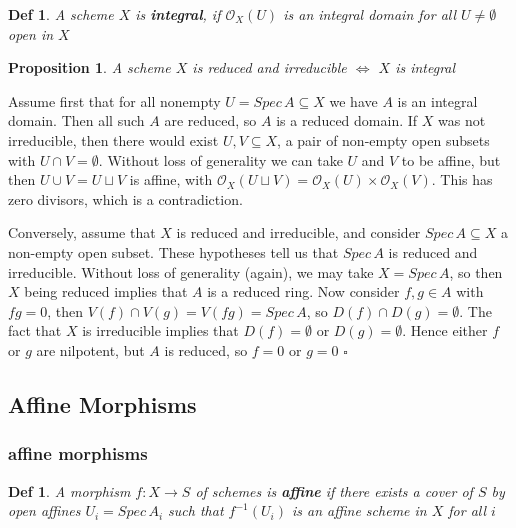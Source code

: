 \documentclass{article}
\newtheorem{definition}[theorem]{Def}
\newtheorem{proposition}[theorem]{Proposition}
\newenvironment{Proof}{{\noindent \indent \it Proof:\quad}}{\hfill $\square$\par}
\begin{document}
\begin{definition}
    A scheme $X$ is \textbf{integral}, if $\mathcal O_X(U)$ is an integral domain for all $U \ne \emptyset$ open in $X$
\end{definition}

\begin{proposition}
    A scheme $X$ is reduced and irreducible $\Leftrightarrow$ $X$ is integral
\end{proposition}
\begin{Proof}
    Assume first that for all nonempty $U = Spec\, A \subseteq X$ we have $A$ is an integral domain. Then all such $A$ are reduced, so $A$ is a reduced domain. If $X$ was not irreducible, then there would exist $U, V \subseteq X$, a pair of non-empty open subsets with $U \cap V = \emptyset$. Without loss of generality we can take $U$ and $V$ to be affine, but then $U \cup V = U \sqcup V$ is affine, with $\mathcal O_X(U \sqcup V) = \mathcal O_X(U)\times \mathcal O_X(V)$. This has zero divisors, which is a contradiction.
    
Conversely, assume that $X$ is reduced and irreducible, and consider
$Spec\, A \subseteq X$ a non-empty open subset. These hypotheses tell us that $Spec\, A$ is reduced and irreducible.
Without loss of generality (again), we may take $X = Spec\, A$, so then $X$ being reduced implies that
$A$ is a reduced ring. Now consider $f, g \in A$ with $fg = 0$, then $V (f) \cap V (g) = V (fg) = Spec\, A$, so
$D(f) \cap D(g) = \emptyset$. The fact that $X$ is irreducible implies that $D(f) = \emptyset$ or $D(g) = \emptyset$. Hence either $f$ or $g$ are nilpotent, but $A$ is reduced, so $f = 0$ or $g = 0$
\end{Proof}





\newpage
\subsection{Affine Morphisms}

\subsubsection{affine morphisms}

\begin{definition}
    A morphism $f : X \to S$ of schemes is \textbf{affine} if there exists a cover of $S$ by open affines $U_i=Spec\,A_i$ such that $f^{-1}(U_i)$ is an affine scheme in $X$ for all $i$
\end{definition}
\end{document}

